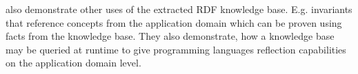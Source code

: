 \documentclass[
	english,
	accentcolor=9c,%
  marginpar=0cm %
	]{tudapub}
\begin{document}
 also demonstrate other uses of the
extracted RDF knowledge base.
E.g. invariants that reference concepts from the application domain which can be
proven using facts from the knowledge base.
They also demonstrate, how a knowledge base may be queried at runtime to give
programming languages reflection capabilities on the application domain level.

%
%
%



\end{document}
